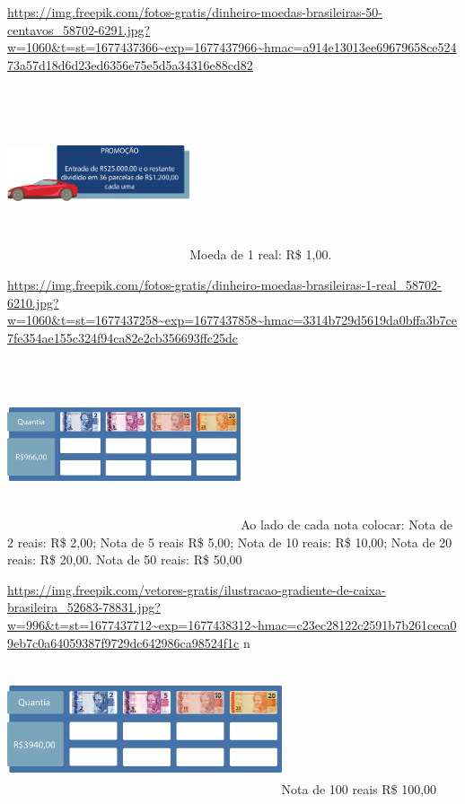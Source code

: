 {\url{https://img.freepik.com/fotos-gratis/dinheiro-moedas-brasileiras-50-centavos_58702-6291.jpg?w=1060\&t=st=1677437366~exp=1677437966~hmac=a914e13013ee69679658ce52473a57d18d6d23ed6356e75e5d5a34316e88cd82}

\includegraphics[width=2.11667in,height=2.01180in]{media/image68.png}Moeda
de 1 real: R\$ 1,00.

\url{https://img.freepik.com/fotos-gratis/dinheiro-moedas-brasileiras-1-real_58702-6210.jpg?w=1060\&t=st=1677437258~exp=1677437858~hmac=3314b729d5619da0bffa3b7ce7fe354ae155c324f94ca82e2cb356693ffc25dc}

\includegraphics[width=2.71068in,height=1.97500in]{media/image69.png}Ao
lado de cada nota colocar: Nota de 2 reais: R\$ 2,00; Nota de 5 reais
R\$ 5,00; Nota de 10 reais: R\$ 10,00; Nota de 20 reais: R\$ 20,00. Nota
de 50 reais: R\$ 50,00

\url{https://img.freepik.com/vetores-gratis/ilustracao-gradiente-de-caixa-brasileira_52683-78831.jpg?w=996\&t=st=1677437712~exp=1677438312~hmac=c23ec28122c2591b7b261ceca09eb7c0a64059387f9729dc642986ca98524f1c}
n

\includegraphics[width=3.18285in,height=1.50833in]{media/image70.png}Nota
de 100 reais R\$ 100,00

}
